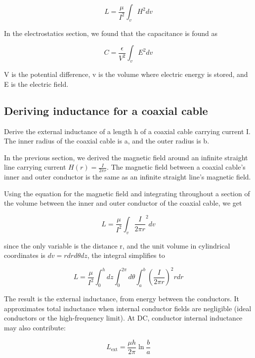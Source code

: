 \documentclass{ximera}
\begin{document}
\begin{equation}
L=\frac{\mu}{I^2} \int_v H^2 dv 
\end{equation}

In the electrostatics section, we found that the capacitance is found as


\begin{equation}
C=\frac{\epsilon}{V^2} \int_v E^2 dv 
\end{equation}

V is the potential difference, v is the volume where electric energy is stored, and E is the electric field.

\begin{example}
\section{Deriving inductance for a coaxial cable}

Derive the external inductance of a length h of a coaxial cable carrying current I. The inner radius of the coaxial cable is a, and the outer radius is b.

\begin{solution}
In the previous section, we derived the magnetic field around an infinite straight line carrying current $H(r)=\frac{I}{2 \pi r}$. The magnetic field between a coaxial cable's inner and outer conductor is the same as an infinite straight line's magnetic field.

Using the equation for the magnetic field and integrating throughout a section of the volume between the inner and outer conductor of the coaxial cable, we get


\begin{equation}
L=\frac{\mu}{I^2} \int_v \frac{I}{2 \pi r}^2 dv 
\end{equation}

since the only variable is the distance r, and the unit volume in cylindrical coordinates is $dv=r dr d\theta dz$, the integral simplifies to


\begin{equation}
L=\frac{\mu}{I^2} \int_0^h dz \int_0^{2 \pi} d\theta \int_a^b (\frac{I}{2 \pi r})^2 r dr
\end{equation}


The result is the external inductance, from energy between the conductors. It approximates total inductance when internal conductor fields are negligible (ideal conductors or the high-frequency limit). At DC, conductor internal inductance may also contribute:

\begin{equation}
L_{\mathrm{ext}}=\frac{\mu h}{2 \pi} \ln\frac{b}{a}
\end{equation}

\end{solution}
\end{example}
\end{document}
